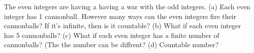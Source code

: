 The even integers are having a having a war with the odd integers.
(a) Each even integer has 1 cannonball.
However many ways can the even integers fire their cannonballs?
If it's infinite, then is it countable?
(b) What if each even integer has 5 cannonballs?
(c) What if each even integer has a finite number of cannonballs?
(The the number can be diffrent?
(d) Countable number?
